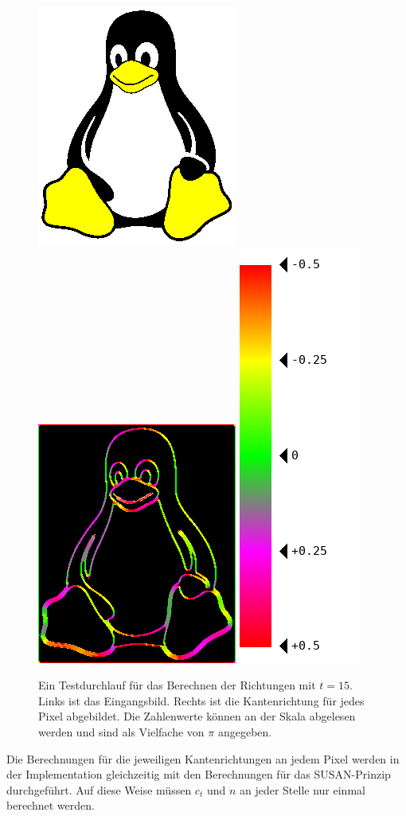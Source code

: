 \documentclass[a4paper, 11pt]{report}
\theoremstyle{definition}
\begin{document}
			\begin{figure}[H]\centering
				\includegraphics[width=.4\textwidth]{../examples/tux/tux.png}\quad
				\includegraphics[width=.4\textwidth]{../examples/tux/15_out_heat.png}\quad
				\includegraphics[width=.14\textwidth]{assets/heatmap-strip/strip.png}
				\caption{Ein Testdurchlauf für das Berechnen der Richtungen mit $t=15$. Links ist das Eingangsbild. Rechts ist die Kantenrichtung für jedes Pixel abgebildet. Die Zahlenwerte können an der Skala abgelesen werden und sind als Vielfache von $\pi$ angegeben.}
				\label{fig:directions_test}
			\end{figure}

			Die Berechnungen für die jeweiligen Kantenrichtungen an jedem Pixel werden in der Implementation gleichzeitig mit den Berechnungen für das SUSAN-Prinzip durchgeführt. Auf diese Weise müssen $c_t$ und $n$ an jeder Stelle nur einmal berechnet werden.
\end{document}
